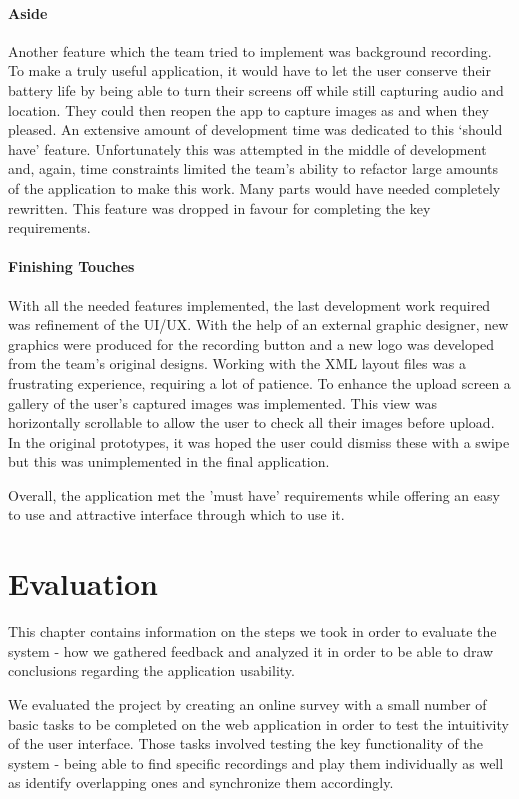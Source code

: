 \documentclass{l3proj}
\begin{document}
\subsubsection{Aside}
Another feature which the team tried to implement was background recording. To make a truly useful application, it would have to let the user conserve their battery life by being able to turn their screens off while still capturing audio and location. They could then reopen the app to capture images as and when they pleased. An extensive amount of development time was dedicated to this ‘should have’ feature. Unfortunately this was attempted in the middle of development and, again, time constraints limited the team's ability to refactor large amounts of the application to make this work. Many parts would have needed completely rewritten. This feature was dropped in favour for completing the key requirements.

\subsubsection{Finishing Touches}
With all the needed features implemented, the last development work required was refinement of the UI/UX. With the help of an external graphic designer, new graphics were produced for the recording button and a new logo was developed from the team's original designs. Working with the XML layout files was a frustrating experience, requiring a lot of patience. To enhance the upload screen a gallery of the user's captured images was implemented. This view was horizontally scrollable to allow the user to check all their images before upload. In the original prototypes, it was hoped the user could dismiss these with a swipe but this was unimplemented in the final application.

Overall, the application met the 'must have' requirements while offering an easy to use and attractive interface through which to use it.

\chapter{Evaluation}

This chapter contains information on the steps we took in order to evaluate the system - how we gathered feedback and analyzed it in order to be able to draw conclusions regarding the application usability.

We evaluated the project by creating an online survey with a small number of basic tasks to be completed on the web application in order to test the intuitivity of the user interface. Those tasks involved testing the key functionality of the system - being able to find specific recordings and play them individually as well as identify overlapping ones and synchronize them accordingly.
\end{document}
